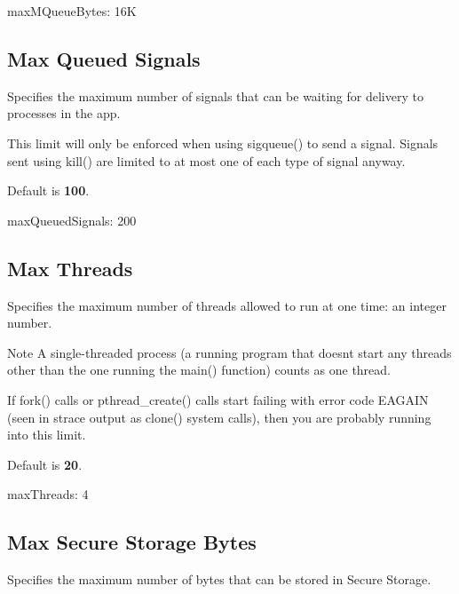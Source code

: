 \begin{DoxyVerb}maxMQueueBytes: 16K
\end{DoxyVerb}
\hypertarget{def_files_adef_defFilesAdef_maxQueuedSignals}{}\subsection{Max Queued Signals}\label{def_files_adef_defFilesAdef_maxQueuedSignals}
Specifies the maximum number of signals that can be waiting for delivery to processes in the app.

This limit will only be enforced when using {\ttfamily sigqueue()} to send a signal. Signals sent using {\ttfamily kill()} are limited to at most one of each type of signal anyway.

Default is {\bfseries 100}.

\begin{DoxyVerb}maxQueuedSignals: 200
\end{DoxyVerb}
\hypertarget{def_files_adef_defFilesAdef_maxThreads}{}\subsection{Max Threads}\label{def_files_adef_defFilesAdef_maxThreads}
Specifies the maximum number of threads allowed to run at one time\+: an integer number.

\begin{DoxyNote}{Note}
A single-\/threaded process (a running program that doesn\textquotesingle{}t start any threads other than the one running the {\ttfamily main()} function) counts as one thread.
\end{DoxyNote}
If {\ttfamily fork()} calls or {\ttfamily pthread\+\_\+create()} calls start failing with error code {\ttfamily E\+A\+G\+A\+I\+N} (seen in strace output as {\ttfamily clone()} system calls), then you are probably running into this limit.

Default is {\bfseries 20}.

\begin{DoxyVerb}maxThreads: 4
\end{DoxyVerb}
\hypertarget{def_files_adef_defFilesAdef_maxSecureStorageBytes}{}\subsection{Max Secure Storage Bytes}\label{def_files_adef_defFilesAdef_maxSecureStorageBytes}
Specifies the maximum number of bytes that can be stored in Secure Storage.

